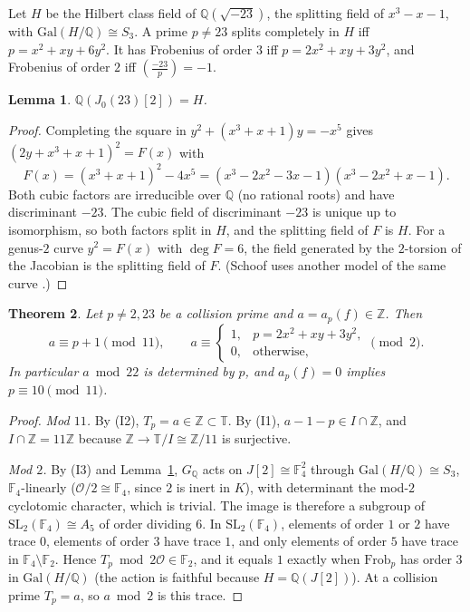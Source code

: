 \documentclass[11pt]{amsart}
\newtheorem{theorem}{Theorem}[section]
\newtheorem{lemma}[theorem]{Lemma}
\theoremstyle{definition}
\theoremstyle{remark}
\newcommand{\Q}{\mathbb{Q}}
\newcommand{\Z}{\mathbb{Z}}
\newcommand{\F}{\mathbb{F}}
\newcommand{\cO}{\mathcal{O}}
\newcommand{\T}{\mathbb{T}}
\newcommand{\SL}{\mathrm{SL}}
\newcommand{\Gal}{\mathrm{Gal}}
\newcommand{\Frob}{\mathrm{Frob}}
\begin{document}
Let $H$ be the Hilbert class field of $\Q(\sqrt{-23})$, the splitting field of $x^3-x-1$, with $\Gal(H/\Q)\cong S_3$. A prime $p\neq23$ splits completely in $H$ iff $p=x^2+xy+6y^2$. It has Frobenius of order $3$ iff $p=2x^2+xy+3y^2$, and Frobenius of order $2$ iff $\left(\frac{-23}{p}\right)=-1$.

\begin{lemma}\label{lem:J2}
$\Q(J_0(23)[2])=H$.
\end{lemma}

\begin{proof}
Completing the square in $y^2+(x^3+x+1)y=-x^5$ gives $(2y+x^3+x+1)^2=F(x)$ with
\[
F(x)=(x^3+x+1)^2-4x^5=(x^3-2x^2-3x-1)(x^3-2x^2+x-1).
\]
Both cubic factors are irreducible over $\Q$ (no rational roots) and have discriminant $-23$. The cubic field of discriminant $-23$ is unique up to isomorphism, so both factors split in $H$, and the splitting field of $F$ is $H$. For a genus-$2$ curve $y^2=F(x)$ with $\deg F=6$, the field generated by the $2$-torsion of the Jacobian is the splitting field of $F$. (Schoof uses another model of the same curve \cite{Schoof}.)
\end{proof}

\begin{theorem}\label{thm:A}
Let $p\neq2,23$ be a collision prime and $a=a_p(f)\in\Z$. Then
\[
a\equiv p+1\pmod{11},\qquad
a\equiv\begin{cases}1,&p=2x^2+xy+3y^2,\\ 0,&\text{otherwise,}\end{cases}\pmod 2.
\]
In particular $a\bmod22$ is determined by $p$, and $a_p(f)=0$ implies $p\equiv10\pmod{11}$.
\end{theorem}

\begin{proof}
\emph{Mod $11$.} By (I2), $T_p=a\in\Z\subset\T$. By (I1), $a-1-p\in I\cap\Z$, and $I\cap\Z=11\Z$ because $\Z\to\T/I\cong\Z/11$ is surjective.

\emph{Mod $2$.} By (I3) and Lemma~\ref{lem:J2}, $G_\Q$ acts on $J[2]\cong\F_4^2$ through $\Gal(H/\Q)\cong S_3$, $\F_4$-linearly ($\cO/2\cong\F_4$, since $2$ is inert in $K$), with determinant the mod-$2$ cyclotomic character, which is trivial. The image is therefore a subgroup of $\SL_2(\F_4)\cong A_5$ of order dividing $6$. In $\SL_2(\F_4)$, elements of order $1$ or $2$ have trace $0$, elements of order $3$ have trace $1$, and only elements of order $5$ have trace in $\F_4\setminus\F_2$. Hence $T_p\bmod2\cO\in\F_2$, and it equals $1$ exactly when $\Frob_p$ has order $3$ in $\Gal(H/\Q)$ (the action is faithful because $H=\Q(J[2])$). At a collision prime $T_p=a$, so $a\bmod2$ is this trace.
\end{proof}
\end{document}
